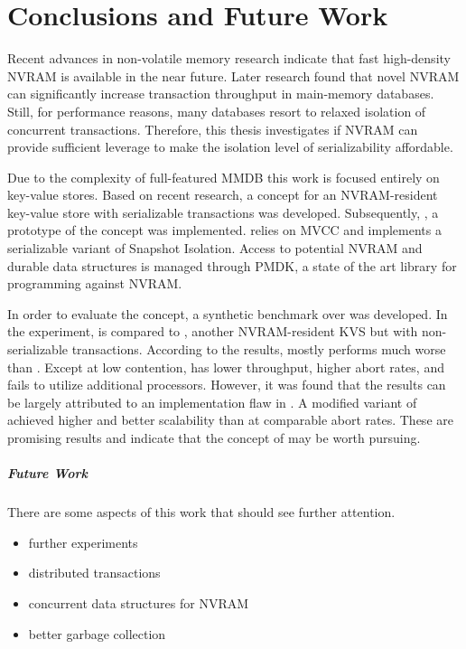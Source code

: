 \chapter{Conclusions and Future Work}
\label{ch:summary}

Recent advances in non-volatile memory research indicate that fast high-density
NVRAM is available in the near future. Later research found that novel NVRAM can
significantly increase transaction throughput in main-memory databases. Still,
for performance reasons, many databases resort to relaxed isolation of
concurrent transactions. Therefore, this thesis investigates if NVRAM can
provide sufficient leverage to make the isolation level of serializability
affordable.

Due to the complexity of full-featured MMDB this work is focused entirely on
key-value stores. Based on recent research, a concept for an NVRAM-resident
key-value store with serializable transactions was developed. Subsequently,
\midas, a prototype of the concept was implemented. \midas relies on MVCC and
implements a serializable variant of Snapshot Isolation. Access to potential
NVRAM and durable data structures is managed through PMDK, a state of the art
library for programming against NVRAM.

In order to evaluate the concept, a synthetic benchmark over \ttp was developed.
In the experiment, \midas is compared to \echo, another NVRAM-resident \ac{KVS} but
with non-serializable transactions. According to the results, \midas mostly
performs much worse than \echo. Except at low contention, \midas has lower
throughput, higher abort rates, and fails to utilize additional processors.
However, it was found that the results can be largely attributed to an
implementation flaw in \midas. A modified variant of \midas achieved higher
\tput and better scalability than \echo at comparable abort rates. These are
promising results and indicate that the concept of \midas may be worth pursuing.

\paragraph{Future Work}

There are some aspects of this work that should see further attention.

\begin{itemize}
    \item further experiments
    \item distributed transactions
    \item concurrent data structures for NVRAM
    \item better garbage collection
\end{itemize}

